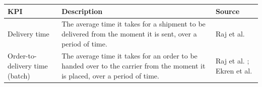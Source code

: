 \documentclass{imc-inf}
\begin{document}
\begin{table}[!htbp]
  \centering
  \small
  \begin{tabular}{@{}>{\raggedright\arraybackslash}p{4cm}p{8cm}>{\raggedright\arraybackslash}p{3cm}@{}}
    \toprule
    \textbf{KPI}                                                                                                                                                                                                                                                                        & \textbf{Description} & \textbf{Source} \\
    \midrule
    Delivery time                                                                                                                                                                                                                                                                       &
    The average time it takes for a shipment to be delivered from the moment it is sent, over a period of time.                                                                                                                                                                         &
    Raj et al. \cite{rajStochasticModelingIntegrated2024}                                                                                                                                                                                                                                                                        \\[6pt]

    Order-to-delivery time (batch)                                                                                                                                                                                                                                                      &
    The average time it takes for an order to be handed over to the carrier from the moment it is placed, over a period of time.                                                                                                                                                        &
    Raj et al. \cite{rajStochasticModelingIntegrated2024}; Ekren et al. \cite{ekrenEnhancingEgroceryOrder2025}                                                                                                                                                                                                                   \\[6pt]


\end{tabular}
\end{table}
\end{document}
